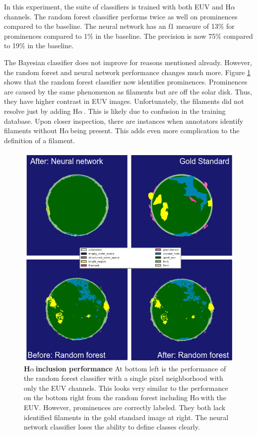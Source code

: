 \documentclass[twoside]{report}
\newcommand{\halpha}{H$\alpha$\,}
\begin{document}
In this experiment, the suite of classifiers is trained with both EUV and \halpha channels. The random forest classifier performs twice as well on prominences compared to the baseline. The neural network has an f1 measure of 13\% for prominences compared to 1\% in the baseline. The precision is now 75\% compared to 19\% in the baseline. 

The Bayesian classifier does not improve for reasons mentioned already. However, the random forest and neural network performance changes much more. Figure \ref{fig:rfhalphaimprove} shows that the random forest classifier now identifies prominences. Prominences are caused by the same phenomenon as filaments but are off the solar disk. Thus, they have higher contrast in EUV images. Unfortunately, the filaments did not resolve just by adding \halpha. This is likely due to confusion in the training database. Upon closer inspection, there are instances when annotators identify filaments without \halpha being present. This adds even more complication to the definition of a filament. 


\begin{figure}[ht]
  \begin{center}
    \includegraphics[scale=0.6]{halphaimprove}
    \caption{{\bf \halpha inclusion performance} At bottom left is the performance of the random forest classifier with a single pixel neighborhood with only the EUV channels. This looks very similar to the performance on the bottom right from the random forest including \halpha with the EUV. However, prominences are correctly labeled. They both lack identified filaments in the gold standard image at right. The neural network classifier loses the ability to define classes clearly.}
    \label{fig:rfhalphaimprove}
 \end{center}
\end{figure}
\end{document}
